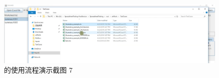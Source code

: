 \begin{figure}[tp]    
    \centering
    \includegraphics[width=\textwidth]{figure/sg/sguard-7.png}
    \caption{\sg 的使用流程演示截图 7}
    \label{figure-sg7}
\end{figure}
